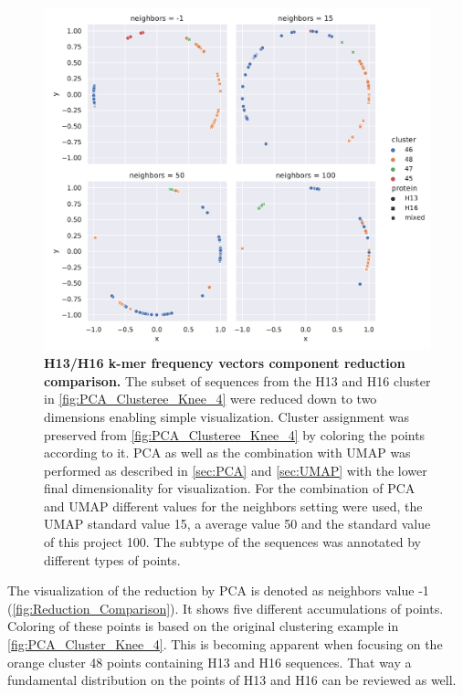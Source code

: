 \begin{figure}[!hbt]
    \centering
    \includegraphics[width=\textwidth]{PCA/Difference_Segment_4_H_metric_cosine.pdf}
    \caption[H13/H16 k-mer frequency vectors component reduction comparison]{\textbf{H13/H16 k-mer frequency vectors component reduction comparison.} The subset of sequences from the H13 and H16 cluster in \autoref{fig:PCA_Clusteree_Knee_4} were reduced down to two dimensions enabling simple visualization. Cluster assignment was preserved from \autoref{fig:PCA_Clusteree_Knee_4} by coloring the points according to it. \gls{PCA} as well as the combination with \gls{UMAP} was performed as described in \autoref{sec:PCA} and \autoref{sec:UMAP} with the lower final dimensionality for visualization. For the combination of \gls{PCA} and \gls{UMAP} different values for the neighbors setting were used, the \gls{UMAP} standard value 15, a average value 50 and the standard value of this project 100. The subtype of the sequences was annotated by different types of points.}
    \label{fig:Reduction_Comparison}
\end{figure}

The visualization of the reduction by \gls{PCA} is denoted as neighbors value -1 (\autoref{fig:Reduction_Comparison}). It shows five different accumulations of points. Coloring of these points is based on the original clustering example in \autoref{fig:PCA_Cluster_Knee_4}. This is becoming apparent when focusing on the orange cluster 48 points containing H13 and H16 sequences. That way a fundamental distribution on the points of H13 and H16 can be reviewed as well. 
%

